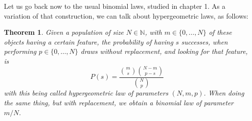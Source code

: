 \documentclass[12pt]{amsbook}
\newtheorem{theorem}{Theorem}[chapter]
\begin{document}
Let us go back now to the usual binomial laws, studied in chapter 1. As a variation of that construction, we can talk about hypergeometric laws, as follows:


\begin{theorem}
Given a population of size $N\in\mathbb N$, with $m\in\{0,\ldots,N\}$ of these objects having a certain feature, the probability of having $s$ successes, when performing $p\in\{0,\ldots,N\}$ draws without replacement, and looking for that feature, is
$$P(s)=\frac{\binom{m}{s}\binom{N-m}{p-s}}{\binom{N}{p}}$$
with this being called hypergeometric law of parameters $(N,m,p)$. When doing the same thing, but with replacement, we obtain a binomial law of parameter $m/N$.
\end{theorem}
\end{document}
